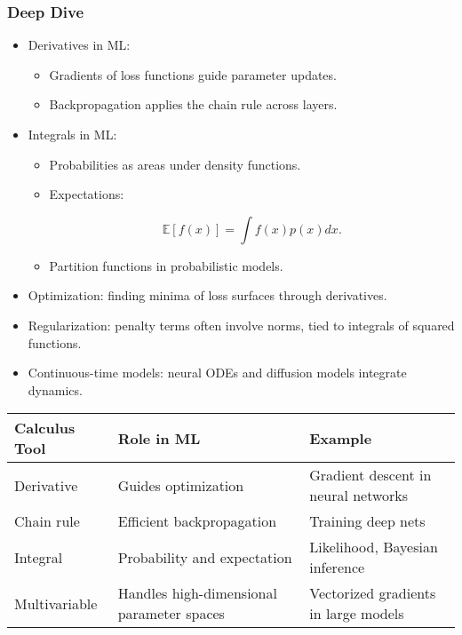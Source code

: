 \documentclass[
  letterpaper,
  DIV=11,
  numbers=noendperiod]{scrreprt}
\providecommand{\tightlist}{%
  \setlength{\itemsep}{0pt}\setlength{\parskip}{0pt}}
\begin{document}
\subsubsection{Deep Dive}\label{deep-dive-119}

\begin{itemize}
\item
  Derivatives in ML:

  \begin{itemize}
  \tightlist
  \item
    Gradients of loss functions guide parameter updates.
  \item
    Backpropagation applies the chain rule across layers.
  \end{itemize}
\item
  Integrals in ML:

  \begin{itemize}
  \item
    Probabilities as areas under density functions.
  \item
    Expectations:

    \[
    \mathbb{E}[f(x)] = \int f(x) p(x) dx.
    \]
  \item
    Partition functions in probabilistic models.
  \end{itemize}
\item
  Optimization: finding minima of loss surfaces through derivatives.
\item
  Regularization: penalty terms often involve norms, tied to integrals
  of squared functions.
\item
  Continuous-time models: neural ODEs and diffusion models integrate
  dynamics.
\end{itemize}

\begin{longtable}[]{@{}
  >{\raggedright\arraybackslash}p{}
  >{\raggedright\arraybackslash}p{}
  >{\raggedright\arraybackslash}p{}@{}}
\toprule\noalign{}
\begin{minipage}[b]{\linewidth}\raggedright
Calculus Tool
\end{minipage} & \begin{minipage}[b]{\linewidth}\raggedright
Role in ML
\end{minipage} & \begin{minipage}[b]{\linewidth}\raggedright
Example
\end{minipage} \\
\midrule\noalign{}
\endhead
\bottomrule\noalign{}
\endlastfoot
Derivative & Guides optimization & Gradient descent in neural
networks \\
Chain rule & Efficient backpropagation & Training deep nets \\
Integral & Probability and expectation & Likelihood, Bayesian
inference \\
Multivariable & Handles high-dimensional parameter spaces & Vectorized
gradients in large models \\
\end{longtable}
\end{document}
